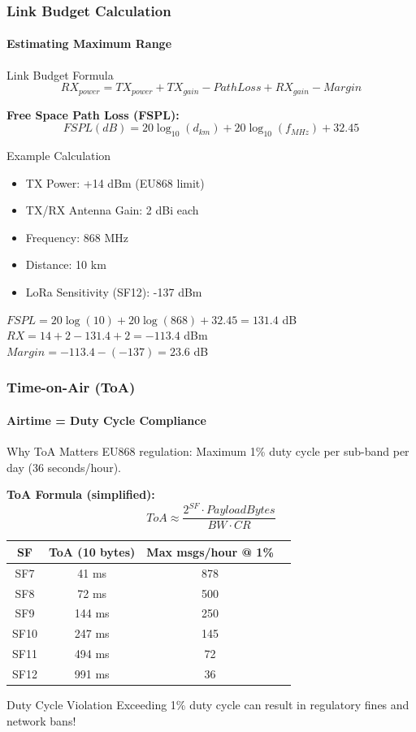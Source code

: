 \documentclass{beamer}
\begin{document}
\begin{frame}[fragile]
\frametitle{Link Budget Calculation}
\framesubtitle{Estimating Maximum Range}

\begin{block}{Link Budget Formula}
\[
RX_{power} = TX_{power} + TX_{gain} - PathLoss + RX_{gain} - Margin
\]
\end{block}

\textbf{Free Space Path Loss (FSPL):}
\[
FSPL(dB) = 20 \log_{10}(d_{km}) + 20 \log_{10}(f_{MHz}) + 32.45
\]

\begin{exampleblock}{Example Calculation}
\begin{itemize}
    \item TX Power: +14 dBm (EU868 limit)
    \item TX/RX Antenna Gain: 2 dBi each
    \item Frequency: 868 MHz
    \item Distance: 10 km
    \item LoRa Sensitivity (SF12): -137 dBm
\end{itemize}
\vspace{0.5em}
$FSPL = 20\log(10) + 20\log(868) + 32.45 = 131.4$ dB \\
$RX = 14 + 2 - 131.4 + 2 = -113.4$ dBm \\
$Margin = -113.4 - (-137) = 23.6$ dB {\color{green}\checkmark}
\end{exampleblock}
\end{frame}

\begin{frame}[fragile]
\frametitle{Time-on-Air (ToA)}
\framesubtitle{Airtime = Duty Cycle Compliance}

\begin{block}{Why ToA Matters}
EU868 regulation: Maximum 1\% duty cycle per sub-band per day (36 seconds/hour).
\end{block}

\textbf{ToA Formula (simplified):}
\[
ToA \approx \frac{2^{SF} \cdot PayloadBytes}{BW \cdot CR}
\]

\begin{table}
\footnotesize
\begin{tabular}{|c|c|c|c|}
\hline
\textbf{SF} & \textbf{ToA (10 bytes)} & \textbf{Max msgs/hour @ 1\%} \\
\hline
SF7  & 41 ms & 878 \\
SF8  & 72 ms & 500 \\
SF9  & 144 ms & 250 \\
SF10 & 247 ms & 145 \\
SF11 & 494 ms & 72 \\
SF12 & 991 ms & 36 \\
\hline
\end{tabular}
\end{table}

\begin{alertblock}{Duty Cycle Violation}
Exceeding 1\% duty cycle can result in regulatory fines and network bans!
\end{alertblock}
\end{frame}
\end{document}
